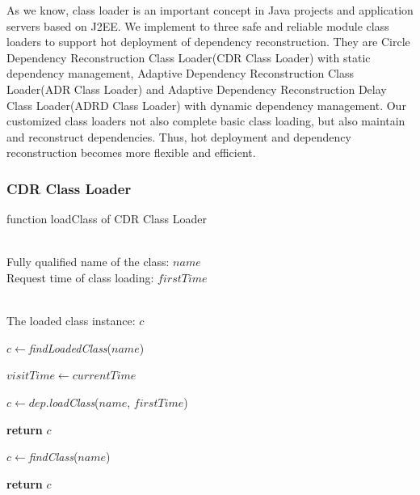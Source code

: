 \documentclass[conference]{IEEEtran}
\begin{document}
As we know, class loader is an important concept in Java projects and application servers based on J2EE.
We implement to three safe and reliable module class loaders to support hot deployment of dependency reconstruction.
They are Circle Dependency Reconstruction Class Loader(CDR Class Loader) with static dependency management, Adaptive Dependency Reconstruction Class Loader(ADR Class Loader) and Adaptive Dependency Reconstruction Delay Class Loader(ADRD Class Loader) with dynamic dependency management.
Our customized class loaders not also complete basic class loading, but also maintain and reconstruct dependencies.
Thus, hot deployment and dependency reconstruction becomes more flexible and efficient.

\subsubsection{CDR Class Loader}

\begin{algorithm}[h]
\caption{function loadClass of CDR Class Loader}
\label{alg:CDR_Class_Loader}
\begin{algorithmic}[1]
\REQUIRE ~~\\
Fully qualified name of the class: $name$ \\
Request time of class loading: $firstTime$

\ENSURE ~~\\
The loaded class instance: $c$

\STATE $c\leftarrow$\emph{findLoadedClass}($name$)


	\STATE $visitTime\leftarrow currentTime$
	
		
		\STATE $c\leftarrow dep.$\emph{loadClass}($name$, $firstTime$)
		
			
			\STATE \textbf{return} $c$

		\ENDIF
	
	\ENDFOR

	\STATE $c\leftarrow$\emph{findClass}($name$)

\ELSE
	
	\STATE \textbf{return} $c$

\ENDIF


\end{algorithmic}
\end{algorithm}
\end{document}
